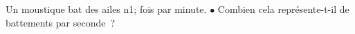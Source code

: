 \documentclass[exercice]{thedocument}%
\begin{document}
%
Un moustique bat des ailes \<n1; fois par minute.\vskip10pt\noindent
$\bullet$\hskip10pt Combien cela représente-t-il de battements par seconde~?
\end{document}
